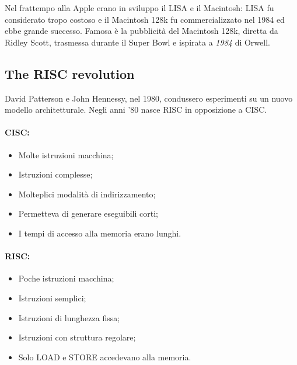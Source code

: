 Nel frattempo alla Apple erano in sviluppo il LISA e il Macintosh:
LISA fu considerato tropo costoso e il Macintosh 128k fu
commercializzato nel 1984 ed ebbe grande successo. Famosa è 
la pubblicità del Macintosh 128k, diretta da Ridley Scott,
trasmessa durante il Super Bowl e ispirata a \textit{1984} di Orwell.

\subsection{The RISC revolution}

David Patterson e John Hennessy, nel 1980, condussero esperimenti
su un nuovo modello architetturale. Negli anni '80 nasce RISC in opposizione
a CISC.

\paragraph{CISC:}

\begin{itemize}
    \item Molte istruzioni macchina;
    \item Istruzioni complesse;
    \item Molteplici modalità di indirizzamento;
    \item Permetteva di generare eseguibili corti;
    \item I tempi di accesso alla memoria erano lunghi.
\end{itemize}


\paragraph{RISC:}

\begin{itemize}
    \item Poche istruzioni macchina;
    \item Istruzioni semplici;
    \item Istruzioni di lunghezza fissa;
    \item Istruzioni con struttura regolare;
    \item Solo LOAD e STORE accedevano alla memoria.
\end{itemize}



